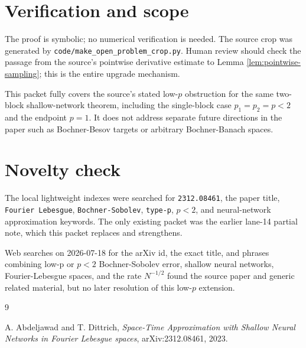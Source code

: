\documentclass[11pt]{amsart}
\theoremstyle{remark}
\begin{document}
\section*{Verification and scope}

The proof is symbolic; no numerical verification is needed.  The source crop
was generated by \texttt{code/make\_open\_problem\_crop.py}.  Human review
should check the passage from the source's pointwise derivative estimate to
Lemma \ref{lem:pointwise-sampling}; this is the entire upgrade mechanism.

This packet fully covers the source's stated low-$p$ obstruction for the same
two-block shallow-network theorem, including the single-block case
$p_1=p_2=p<2$ and the endpoint $p=1$.  It does not address separate future
directions in the paper such as Bochner-Besov targets or arbitrary
Bochner-Banach spaces.

\section*{Novelty check}

The local lightweight indexes were searched for \texttt{2312.08461}, the
paper title, \texttt{Fourier Lebesgue}, \texttt{Bochner-Sobolev},
\texttt{type-p}, $p<2$, and neural-network approximation keywords.
The only existing packet was the earlier lane-14 partial note, which this
packet replaces and strengthens.

Web searches on 2026-07-18 for the arXiv id, the exact title, and phrases
combining low-p or $p<2$ Bochner-Sobolev error, shallow neural networks,
Fourier-Lebesgue spaces, and the rate $N^{-1/2}$ found the source paper and
generic related material, but no later resolution of this low-$p$ extension.

\begin{thebibliography}{9}

A. Abdeljawad and T. Dittrich,
\emph{Space-Time Approximation with Shallow Neural Networks in Fourier
Lebesgue spaces},
arXiv:2312.08461, 2023.

\end{thebibliography}
\end{document}
